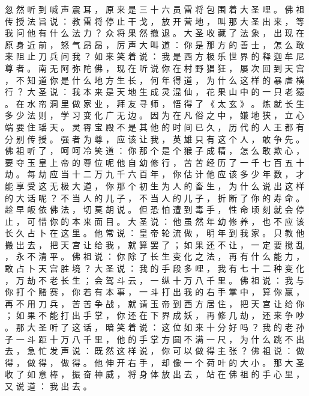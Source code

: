 {忽 然 听 到 喊 声 震 耳 ， 原 来 是 三 十 六 员 雷 将 包 围 着 大 圣 哩 。
佛 祖 传 授 法 旨 说 ： 教 雷 将 停 止 干 戈 ， 放 开 营 地 ， 叫 那 大 圣 出 来 ， 等 我 问 他 有 什 么 法 力 ？
众 将 果 然 撤 退 。
大 圣 收 藏 了 法 象 ， 出 现 在 原 身 近 前 ， 怒 气 昂 昂 ， 厉 声 大 叫 道 ： 你 是 那 方 的 善 士 ， 怎 么 敢 来 阻 止 刀 兵 问 我 ？ 如 来 笑 着 说 ： 我 是 西 方 极 乐 世 界 的 释 迦 牟 尼 尊 者 。
南 无 阿 弥 陀 佛 ， 现 在 听 说 你 在 村 野 猖 狂 ， 屡 次 回 到 天 宫 ， 不 知 道 你 是 什 么 地 方 生 长 ， 何 年 得 道 ， 为 什 么 这 样 的 暴 虐 横 行 ？ 大 圣 说 ： 我 本 来 是 天 地 生 成 灵 混 仙 ， 花 果 山 中 的 一 只 老 猿 。
在 水 帘 洞 里 做 家 业 ， 拜 友 寻 师 ， 悟 得 了 《 太 玄 》 。
炼 就 长 生 多 少 法 则 ， 学 习 变 化 广 无 边 。
因 为 在 凡 俗 之 中 ， 嫌 地 狭 ， 立 心 端 要 住 瑶 天 。
灵 霄 宝 殿 不 是 其 他 的 时 间 已 久 ， 历 代 的 人 王 都 有 分 别 传 授 。
强 者 为 尊 ， 应 该 让 我 ， 英 雄 只 有 这 个 人 ， 敢 争 先 。
佛 祖 听 了 ， 呵 呵 冷 笑 道 ： 你 那 个 是 个 猴 子 成 精 ， 怎 么 敢 欺 心 ， 要 夺 玉 皇 上 帝 的 尊 位 呢 他 自 幼 修 行 ， 苦 苦 经 历 了 一 千 七 百 五 十 劫 。
每 劫 应 当 十 二 万 九 千 六 百 年 ， 你 估 计 他 应 该 多 少 年 数 ， 才 能 享 受 这 无 极 大 道 ， 你 那 个 初 生 为 人 的 畜 生 ， 为 什 么 说 出 这 样 的 大 话 呢 ？ 不 当 人 的 儿 子 ， 不 当 人 的 儿 子 ， 折 断 了 你 的 寿 命 。
趁 早 皈 依 佛 法 ， 切 莫 胡 说 。
但 恐 怕 遭 到 毒 手 ， 性 命 顷 刻 就 会 停 止 ， 可 惜 你 的 本 来 面 目 。
大 圣 说 ： 他 虽 然 年 幼 修 养 ， 也 不 应 该 长 久 占 卜 在 这 里 。
他 常 说 ： 皇 帝 轮 流 做 ， 明 年 到 我 家 。
只 教 他 搬 出 去 ， 把 天 宫 让 给 我 ， 就 算 罢 了 ； 如 果 还 不 让 ， 一 定 要 搅 乱 ， 永 不 清 平 。
佛 祖 说 ： 你 除 了 长 生 变 化 之 法 ， 再 有 什 么 能 力 ， 敢 占 卜 天 宫 胜 境 ？ 大 圣 说 ： 我 的 手 段 多 哩 ， 我 有 七 十 二 种 变 化 ， 万 劫 不 老 长 生 ； 会 驾 斗 云 ， 一 纵 十 万 八 千 里 。
佛 祖 说 ： 我 与 你 打 个 赌 赛 ， 你 若 有 本 事 ， 一 斗 打 出 我 的 右 手 掌 中 ， 算 你 赢 ， 再 不 用 刀 兵 ， 苦 苦 争 战 ， 就 请 玉 帝 到 西 方 居 住 ， 把 天 宫 让 给 你 ； 如 果 不 能 打 出 手 掌 ， 你 还 在 下 界 成 妖 ， 再 修 几 劫 ， 还 来 争 吵 。
那 大 圣 听 了 这 话 ， 暗 笑 着 说 ： 这 位 如 来 十 分 好 吗 ？
我 的 老 孙 子 一 斗 距 十 万 八 千 里 ， 他 的 手 掌 方 圆 不 满 一 尺 ， 为 什 么 跳 不 出 去 ， 急 忙 发 声 说 ： 既 然 这 样 说 ， 你 可 以 做 得 主 张 ？ 佛 祖 说 ： 做 得 ， 做 得 ， 做 得 。
他 伸 开 右 手 ， 却 像 一 个 荷 叶 的 大 小 。
那 大 圣 收 了 如 意 棒 ， 振 奋 神 威 ， 将 身 体 放 出 去 ， 站 在 佛 祖 的 手 心 里 ， 又 说 道 ： 我 出 去 。
}
